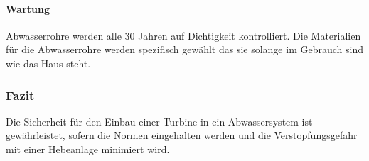 \paragraph{Wartung}
Abwasserrohre werden alle 30 Jahren auf Dichtigkeit kontrolliert. Die Materialien für die Abwasserrohre werden spezifisch gewählt das sie solange im Gebrauch sind wie das Haus steht. \cite{}

\subsubsection{Fazit}

Die Sicherheit für den Einbau einer Turbine in ein Abwassersystem ist gewährleistet, sofern die Normen eingehalten werden und die Verstopfungsgefahr mit einer Hebeanlage minimiert wird. 

\clearpage 





